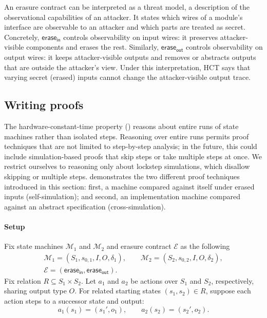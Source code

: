 \documentclass[fontset=fira-newtxsf]{mitthesis}
\theoremstyle{definition}
\theoremstyle{plain}
\begin{document}
An erasure contract can be interpreted as a threat model, a description of the observational capabilities of an attacker.
It states which wires of a module's interface are observable to an attacker and which parts are treated as secret.
Concretely, $\mathsf{erase_{in}}$ controls observability on input wires: it preserves attacker-visible components and erases the rest.
Similarly, $\mathsf{erase_{out}}$ controls observability on output wires: it keeps attacker-visible outputs and removes or abstracts outputs that are outside the attacker's view.
Under this interpretation, HCT says that varying secret (erased) inputs cannot change the attacker-visible output trace.

\label{sec:timing-proof}
\subsection{Writing proofs} \label{sec:timing-proof-lockstep}
The hardware-constant-time property () reasons about entire runs of state machines rather than isolated steps.
Reasoning over entire runs permits proof techniques that are not limited to step-by-step analysis; in the future, this could include simulation-based proofs that skip steps or take multiple steps at once.
We restrict ourselves to reasoning only about lockstep simulations, which disallow skipping or multiple steps.
 demonstrates the two different proof techniques introduced in this section: first, a machine compared against itself under erased inputs (self-simulation); and second, an implementation machine compared against an abstract specification (cross-simulation).

\paragraph{Setup}
Fix state machines $\mathcal{M}_1$ and $\mathcal{M}_2$ and erasure contract $\mathcal{E}$ as the following
\begin{gather*}
  \mathcal{M}_1 = (S_1, s_{0,1}, I, O, \delta_1), \qquad
  \mathcal{M}_2 = (S_2, s_{0,2}, I, O, \delta_2),\\
  \mathcal{E} = (\mathsf{erase_{in}},\mathsf{erase_{out}}).
\end{gather*}
Fix relation $R \subseteq S_1 \times S_2$. Let $a_1$ and $a_2$ be actions over $S_1$ and $S_2$, respectively, sharing output type $O$.
For related starting states $(s_1,s_2)\in R$, suppose each action steps to a successor state and output:
\[
  a_1(s_1)=(s_1',o_1),\qquad a_2(s_2)=(s_2',o_2).
\]
\end{document}
